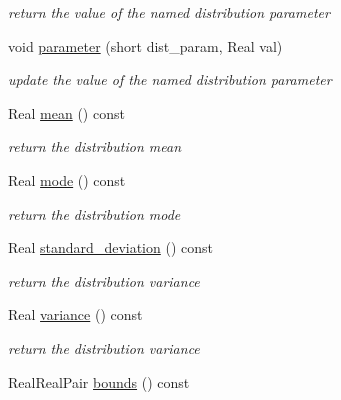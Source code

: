 \begin{DoxyCompactItemize}
\begin{DoxyCompactList}\small\item\em return the value of the named distribution parameter \end{DoxyCompactList}\item 
void \hyperlink{classPecos_1_1GumbelRandomVariable_ae8e123224f588aee676d5d56d5ca900d}{parameter} (short dist\+\_\+param, Real val)\label{classPecos_1_1GumbelRandomVariable_ae8e123224f588aee676d5d56d5ca900d}

\begin{DoxyCompactList}\small\item\em update the value of the named distribution parameter \end{DoxyCompactList}\item 
Real \hyperlink{classPecos_1_1GumbelRandomVariable_a962ffe5a3593be370d5c883365c060f4}{mean} () const \label{classPecos_1_1GumbelRandomVariable_a962ffe5a3593be370d5c883365c060f4}

\begin{DoxyCompactList}\small\item\em return the distribution mean \end{DoxyCompactList}\item 
Real \hyperlink{classPecos_1_1GumbelRandomVariable_a72d3d6926edd929cb3f8e12baa655f70}{mode} () const \label{classPecos_1_1GumbelRandomVariable_a72d3d6926edd929cb3f8e12baa655f70}

\begin{DoxyCompactList}\small\item\em return the distribution mode \end{DoxyCompactList}\item 
Real \hyperlink{classPecos_1_1GumbelRandomVariable_a6a4ed9624d511f8a4e4f509c82cb0706}{standard\+\_\+deviation} () const \label{classPecos_1_1GumbelRandomVariable_a6a4ed9624d511f8a4e4f509c82cb0706}

\begin{DoxyCompactList}\small\item\em return the distribution variance \end{DoxyCompactList}\item 
Real \hyperlink{classPecos_1_1GumbelRandomVariable_a4b8b05b2a9af92dad9cc304c2925a4eb}{variance} () const \label{classPecos_1_1GumbelRandomVariable_a4b8b05b2a9af92dad9cc304c2925a4eb}

\begin{DoxyCompactList}\small\item\em return the distribution variance \end{DoxyCompactList}\item 
Real\+Real\+Pair \hyperlink{classPecos_1_1GumbelRandomVariable_a4bdb95a8fa5fffaa0de5102f56963cf2}{bounds} () const \label{classPecos_1_1GumbelRandomVariable_a4bdb95a8fa5fffaa0de5102f56963cf2}


\end{DoxyCompactItemize}

